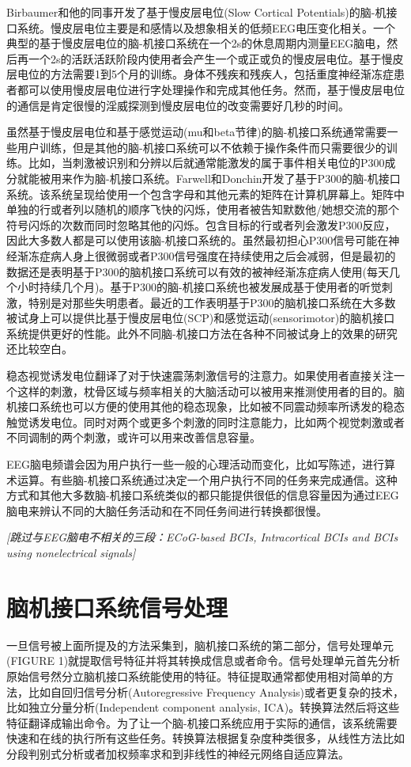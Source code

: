 Birbaumer和他的同事开发了基于慢皮层电位(Slow Cortical Potentials)的脑-机接口系统。慢皮层电位主要是和感情以及想象相关的低频EEG电压变化相关。一个典型的基于慢皮层电位的脑-机接口系统在一个2s的休息周期内测量EEG脑电，然后再一个2s的活跃活跃阶段内使用者会产生一个或正或负的慢皮层电位。基于慢皮层电位的方法需要1到5个月的训练。身体不残疾和残疾人，包括重度神经渐冻症患者都可以使用慢皮层电位进行字处理操作和完成其他任务。然而，基于慢皮层电位的通信是肯定很慢的淫威探测到慢皮层电位的改变需要好几秒的时间。

虽然基于慢皮层电位和基于感觉运动(mu和beta节律)的脑-机接口系统通常需要一些用户训练，但是其他的脑-机接口系统可以不依赖于操作条件而只需要很少的训练。比如，当刺激被识别和分辨以后就通常能激发的属于事件相关电位的P300成分就能被用来作为脑-机接口系统。Farwell和Donchin开发了基于P300的脑-机接口系统。该系统呈现给使用一个包含字母和其他元素的矩阵在计算机屏幕上。矩阵中单独的行或者列以随机的顺序飞快的闪烁，使用者被告知默数他/她想交流的那个符号闪烁的次数而同时忽略其他的闪烁。包含目标的行或者列会激发P300反应，因此大多数人都是可以使用该脑-机接口系统的。虽然最初担心P300信号可能在神经渐冻症病人身上很微弱或者P300信号强度在持续使用之后会减弱，但是最初的数据还是表明基于P300的脑机接口系统可以有效的被神经渐冻症病人使用(每天几个小时持续几个月)。基于P300的脑-机接口系统也被发展成基于使用者的听觉刺激，特别是对那些失明患者。最近的工作表明基于P300的脑机接口系统在大多数被试身上可以提供比基于慢皮层电位(SCP)和感觉运动(sensorimotor)的脑机接口系统提供更好的性能。此外不同脑-机接口方法在各种不同被试身上的效果的研究还比较空白。

稳态视觉诱发电位翻译了对于快速震荡刺激信号的注意力。如果使用者直接关注一个这样的刺激，枕骨区域与频率相关的大脑活动可以被用来推测使用者的目的。脑机接口系统也可以方便的使用其他的稳态现象，比如被不同震动频率所诱发的稳态触觉诱发电位。同时对两个或更多个刺激的同时注意能力，比如两个视觉刺激或者不同调制的两个刺激，或许可以用来改善信息容量。

EEG脑电频谱会因为用户执行一些一般的心理活动而变化，比如写陈述，进行算术运算。有些脑-机接口系统通过决定一个用户执行不同的任务来完成通信。这种方式和其他大多数脑-机接口系统类似的都只能提供很低的信息容量因为通过EEG脑电来辨认不同的大脑任务活动和在不同任务间进行转换都很慢。

\textit{[跳过与EEG脑电不相关的三段：ECoG-based BCIs, Intracortical BCIs and BCIs using nonelectrical signals]}

\section*{脑机接口系统信号处理}
一旦信号被上面所提及的方法采集到，脑机接口系统的第二部分，信号处理单元(FIGURE 1)就提取信号特征并将其转换成信息或者命令。信号处理单元首先分析原始信号然分立脑机接口系统能使用的特征。特征提取通常都使用相对简单的方法，比如自回归信号分析(Autoregressive Frequency Analysis)或者更复杂的技术，比如独立分量分析(Independent component analysis, ICA)。转换算法然后将这些特征翻译成输出命令。为了让一个脑-机接口系统应用于实际的通信，该系统需要快速和在线的执行所有这些任务。转换算法根据复杂度种类很多，从线性方法比如分段判别式分析或者加权频率求和到非线性的神经元网络自适应算法。

